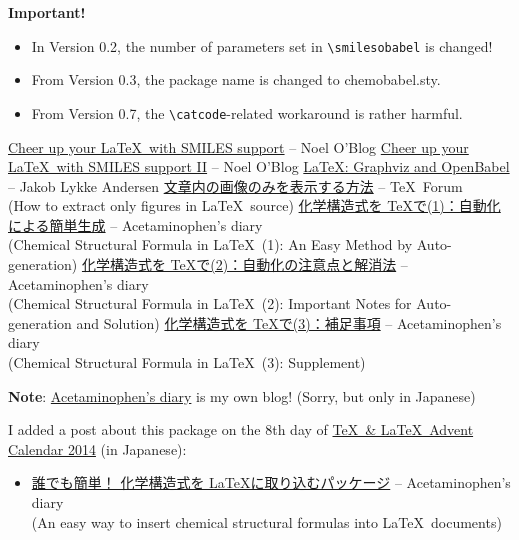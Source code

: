 \documentclass[12pt]{jsarticle}
\begin{document}
\textbf{Important!}
\begin{itemize}
\item In Version 0.2, the number of parameters set in \verb|\smilesobabel| is changed!
\item From Version 0.3, the package name is changed to \textsf{chemobabel.sty}.
\item From Version 0.7, the \verb|\catcode|-related workaround is rather harmful.
\end{itemize}

\clearpage

\begin{thebibliography}{9}
\href{http://baoilleach.blogspot.jp/2012/03/cheer-up-your-latex-with-smiles-support.html}{Cheer up your \LaTeX\ with SMILES support} -- Noel O'Blog
\href{http://baoilleach.blogspot.jp/2012/04/cheer-up-your-latex-with-smiles-support.html}{Cheer up your \LaTeX\ with SMILES support II} -- Noel O'Blog
\href{http://imada.sdu.dk/~jlandersen/}{\LaTeX: Graphviz and OpenBabel} -- Jakob Lykke Andersen
\href{http://oku.edu.mie-u.ac.jp/tex/mod/forum/discuss.php?d=1411}{文章内の画像のみを表示する方法} -- \TeX\ Forum \\
(How to extract only figures in \LaTeX\ source)
\href{http://acetaminophen.hatenablog.com/entry/2014/11/02/130624}{化学構造式を \TeX で(1)：自動化による簡単生成} -- Acetaminophen's diary \\
(Chemical Structural Formula in \LaTeX\ (1): An Easy Method by Auto-generation)
\href{http://acetaminophen.hatenablog.com/entry/2014/11/02/130624}{化学構造式を \TeX で(2)：自動化の注意点と解消法} -- Acetaminophen's diary \\
(Chemical Structural Formula in \LaTeX\ (2): Important Notes for Auto-generation and Solution)
\href{http://acetaminophen.hatenablog.com/entry/2014/11/05/135927}{化学構造式を \TeX で(3)：補足事項} -- Acetaminophen's diary \\
(Chemical Structural Formula in \LaTeX\ (3): Supplement)
\end{thebibliography}

\noindent
\textbf{Note}: \href{http://acetaminophen.hatenablog.com/}{Acetaminophen's diary} is my own blog! (Sorry, but only in Japanese)

I added a post about this package on the 8th day of \href{http://www.adventar.org/calendars/553}{\TeX\ \& \LaTeX\ Advent Calendar 2014} (in Japanese):
\begin{itemize}
\item \href{http://acetaminophen.hatenablog.com/entry/2014/12/08/053519}{誰でも簡単！ 化学構造式を \LaTeX に取り込むパッケージ} -- Acetaminophen's diary \\
(An easy way to insert chemical structural formulas into \LaTeX\ documents)
\end{itemize}
\end{document}
